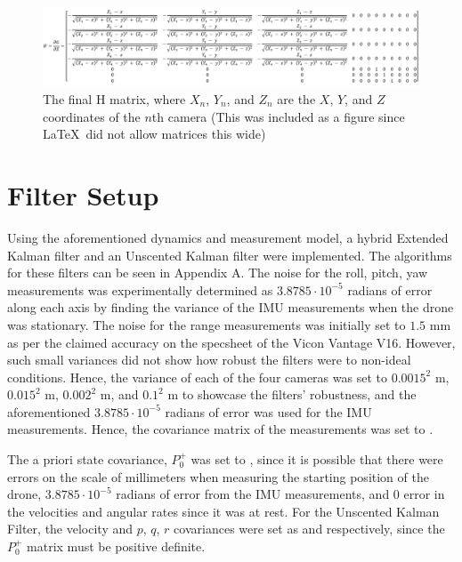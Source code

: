 \documentclass[letterpaper, paper,11pt]{AAS}	%
\begin{document}
\begin{figure}[H]
	\centering\includegraphics[width=\textwidth]{Figures/HMatrix}
	\caption{The final H matrix, where $X_n$, $Y_n$, and $Z_n$ are the $X$, $Y$, and $Z$ coordinates of the $n$th camera (This was included as a figure since \LaTeX\ did not allow matrices this wide)}
	\label{fig:HMatrix}
\end{figure}

\section{Filter Setup}

Using the aforementioned dynamics and measurement model, a hybrid Extended Kalman filter and an Unscented Kalman filter were implemented\cite{Simon}. The algorithms for these filters can be seen in Appendix A. The noise for the roll, pitch, yaw measurements was experimentally determined as $3.8785\cdot 10^{-5}$ radians of error along each axis by finding the variance of the IMU measurements when the drone was stationary. The noise for the range measurements was initially set to $1.5$ mm as per the claimed accuracy on the specsheet of the Vicon Vantage V16\cite{V16}. However, such small variances did not show how robust the filters were to non-ideal conditions. Hence, the variance of each of the four cameras was set to $0.0015^2$ m, $0.015^2$ m, $0.002^2$ m, and $0.1^2$ m to showcase the filters' robustness, and the aforementioned $3.8785\cdot 10^{-5}$ radians of error was used for the IMU measurements. Hence, the covariance matrix of the measurements was set to .

The a priori state covariance, $P_0^+$ was set to , since it is possible that there were errors on the scale of millimeters when measuring the starting position of the drone, $3.8785\cdot 10^{-5}$ radians of error from the IMU measurements, and 0 error in the velocities and angular rates since it was at rest. For the Unscented Kalman Filter, the velocity and $p$, $q$, $r$ covariances were set as  and  respectively, since the $P_0^+$ matrix must be positive definite.
\end{document}
